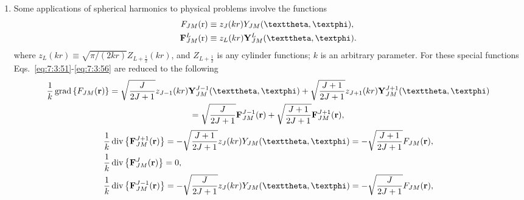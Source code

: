 \begin{enumerate}[label=(\alph*)]
\begin{align}
& =i\left(\frac{d}{d r}+\frac{1}{r}\right) f(r) \vect{Y}_{J M}^{(1)}(\vartheta, \varphi)+i \sqrt{J(J+1)} \frac{1}{r} f(r) \vect{Y}_{J M}^{(-1)}(\vartheta, \varphi), \label{eq:7:3:56}\\
 \boldsymbol{\nabla} \times\left[f(r) \vect{Y}_{J M}^{(-1)}(\vartheta, \varphi)\right] &\equiv \curl \left[f(r) \vect{Y}_{J M}^{(-1)}(\vartheta, \varphi)\right]=-i \sqrt{J(J+1)} \frac{1}{r} f(r) \vect{Y}_{J M}^{(0)}(\vartheta, \varphi). \notag
\end{align}
\item Some applications of spherical harmonics to physical problems involve the functions
\begin{align}
F_{J M}(\mathrm{r}) & \equiv z_{J}(k r) Y_{J M}(\vartheta, \varphi), \notag\\
\vect{F}_{J M}^{L}(\mathrm{r}) & \equiv z_{L}(k r) \vect{Y}_{J M}^{L}(\vartheta, \varphi). \label{eq:7:3:57}
\end{align}
where $z_{L}(k r) \equiv \sqrt{\pi /(2 k r)} Z_{L+\frac{1}{2}}(k r)$, and $Z_{L+\frac{1}{2}}$ is any cylinder functions; $k$ is an arbitrary parameter. For these special functions Eqs.~\eqref{eq:7:3:51}-\eqref{eq:7:3:56} are reduced to the following
\begin{multline}
 \frac{1}{k} \grad \left\{F_{J M}(\vect{r})\right\}=\sqrt{\frac{J}{2 J+1}} z_{J-1}(k r) \vect{Y}_{J M}^{J-1}(\vartheta, \varphi)+\sqrt{\frac{J+1}{2 J+1}} z_{J+1}(k r) \vect{Y}_{J M}^{J+1}(\vartheta, \varphi) \\
=\sqrt{\frac{J}{2 J+1}} \vect{F}_{J M}^{J-1}(\vect{r})+\sqrt{\frac{J+1}{2 J+1}} \vect{F}_{J M}^{J+1}(\vect{r}), \label{eq:7:3:58}
\end{multline}
\begin{equation}
\begin{aligned}
& \frac{1}{k} \diver \left\{\vect{F}_{J M}^{J+1}(\vect{r})\right\}=-\sqrt{\frac{J+1}{2 J+1}} z_{J}(k r) Y_{J M}(\vartheta, \varphi)=-\sqrt{\frac{J+1}{2 J+1}} F_{J M}(\vect{r}), \\
& \frac{1}{k} \diver \left\{\vect{F}_{J M}^{J}(\vect{r})\right\}=0, \\
& \frac{1}{k} \diver \left\{\vect{F}_{J M}^{J-1}(\vect{r})\right\}=-\sqrt{\frac{J}{2 J+1}} z_{J}(k r) Y_{J M}(\vartheta, \varphi)=-\sqrt{\frac{J}{2 J+1}} F_{J M}(\vect{r}), 
\end{aligned}\label{eq:7:3:59}
\end{equation}


\end{enumerate}
